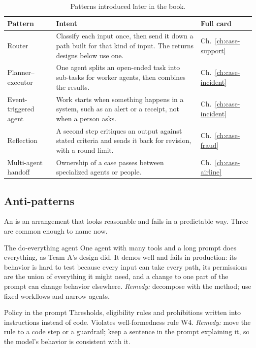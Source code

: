 \begin{table}[htbp]
\centering
\small
\caption{Patterns introduced later in the book.}
\label{tab:later-patterns}
\begin{tabularx}{\textwidth}{@{}>{\raggedright\arraybackslash}p{3.2cm}>{\raggedright\arraybackslash}X>{\raggedright\arraybackslash}p{2.2cm}@{}}
\toprule
Pattern & Intent & Full card \\
\midrule
Router & Classify each input once, then send it down a path built for that kind of input. The returns designs below use one. & Ch.~\ref{ch:case-support} \\
Planner--executor & One agent splits an open-ended task into sub-tasks for worker agents, then combines the results. & Ch.~\ref{ch:case-incident} \\
Event-triggered agent & Work starts when something happens in a system, such as an alert or a receipt, not when a person asks. & Ch.~\ref{ch:case-incident} \\
Reflection & A second step critiques an output against stated criteria and sends it back for revision, with a round limit. & Ch.~\ref{ch:case-fraud} \\
Multi-agent handoff & Ownership of a case passes between specialized agents or people. & Ch.~\ref{ch:case-airline} \\
\bottomrule
\end{tabularx}
\end{table}

\subsection{Anti-patterns}

An  is an arrangement that looks reasonable and fails in a predictable way. Three are common enough to name now.

\begin{antipattern}{The do-everything agent}
One agent with many tools and a long prompt does everything, as Team A's design did. It demos well and fails in production: its behavior is hard to test because every input can take every path, its permissions are the union of everything it might need, and a change to one part of the prompt can change behavior elsewhere. \emph{Remedy:} decompose with the method; use fixed workflows and narrow agents.
\end{antipattern}

\begin{antipattern}{Policy in the prompt}
Thresholds, eligibility rules and prohibitions written into instructions instead of code. Violates well-formedness rule W4. \emph{Remedy:} move the rule to a code step or a guardrail; keep a sentence in the prompt explaining it, so the model's behavior is consistent with it.
\end{antipattern}

